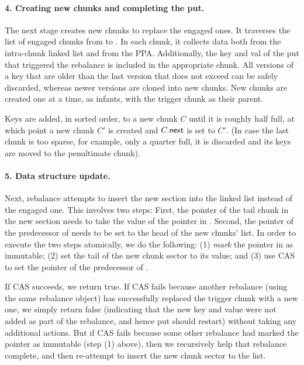 \paragraph{4. Creating new chunks and completing the put.}

The next stage creates new chunks to replace the engaged ones. It traverses the list of engaged chunks from  to .
In each chunk, it collects data both from the intra-chunk linked list and from the PPA. Additionally, 
the key and val of the put that triggered the rebalance is included in the appropriate chunk. 
All versions of a key that are older than the last version that does not exceed  can be safely discarded, whereas
newer versions are cloned into new chunks. New chunks are created one at a time, as infants, with the trigger chunk as their parent.

Keys are added, in sorted order, to a new chunk $C$ until it is roughly half full, at which point a new chunk $C'$ is created
and $C.\code{next}$ is set to $C'$. (In case the last chunk is too sparse, for example, only a quarter full, it is discarded and its keys are moved to the  penultimate chunk).

\paragraph{5. Data structure update.}

Next, rebalance attempts to insert the new section into the linked list instead of the engaged one.
This involves two steps: First, the  pointer of the tail chunk in the new section needs to take the value of
the  pointer in . Second, the  pointer of the predecessor of  needs to be set to the head of
the new chunks' list. In order to execute the two steps atomically, we do the following:
(1) \emph{mark} the  pointer in  as immutable;
(2) set the tail of the new chunk sector to its value; and
(3) use CAS to set the  pointer of the predecessor of .

If CAS succeeds, we return true.
If CAS fails because another rebalance (using the same rebalance object) has successfully replaced the trigger chunk with a new one, we simply return false (indicating that the new key and value were not added as part of the rebalance, and hence put should restart) 
without taking any additional actions. But if CAS fails because some other rebalance had marked the  pointer as immutable (step (1) above), then we recursively help that rebalance complete, and then re-attempt to insert the new chunk sector to the list.

